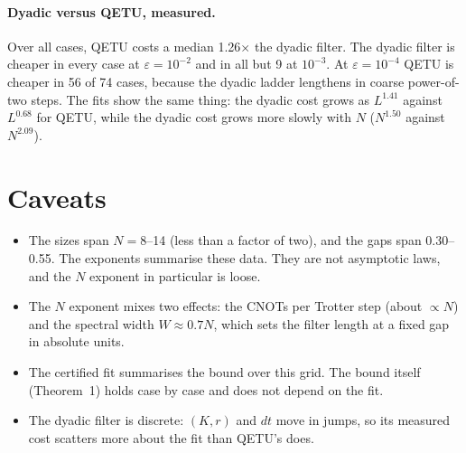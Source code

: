 \documentclass[10pt]{article}
\begin{document}
\paragraph{Dyadic versus QETU, measured.} Over all cases, QETU costs a median 1.26$\times$ the dyadic filter.
The dyadic filter is cheaper in every case at $\varepsilon=10^{-2}$ and in all but 9 at $10^{-3}$. At
$\varepsilon=10^{-4}$ QETU is cheaper in 56 of 74 cases, because the dyadic ladder lengthens in coarse
power-of-two steps. The fits show the same thing: the dyadic cost grows as $L^{1.41}$ against $L^{0.68}$ for
QETU, while the dyadic cost grows more slowly with $N$ ($N^{1.50}$ against $N^{2.09}$).

\section{Caveats}
\begin{itemize}
\item The sizes span $N=8$--14 (less than a factor of two), and the gaps span 0.30--0.55. The exponents
summarise these data. They are not asymptotic laws, and the $N$ exponent in particular is loose.
\item The $N$ exponent mixes two effects: the CNOTs per Trotter step (about $\propto N$) and the spectral width
$W\approx0.7N$, which sets the filter length at a fixed gap in absolute units.
\item The certified fit summarises the bound over this grid. The bound itself (Theorem~1) holds case by case
and does not depend on the fit.
\item The dyadic filter is discrete: $(K,r)$ and $dt$ move in jumps, so its measured cost scatters more about
the fit than QETU's does.
\end{itemize}
\end{document}
